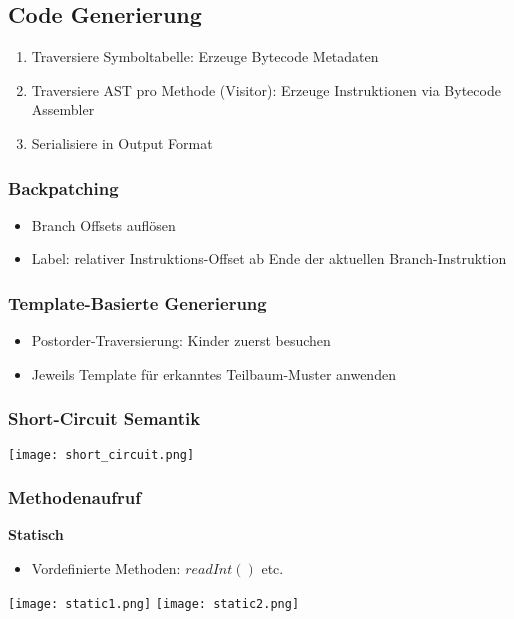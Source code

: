 \subsection{Code Generierung}
\begin{enumerate}
    \item Traversiere Symboltabelle: Erzeuge Bytecode Metadaten
    \item Traversiere AST pro Methode (Visitor): Erzeuge Instruktionen via Bytecode Assembler
    \item Serialisiere in Output Format
\end{enumerate}

\subsubsection{Backpatching}
\begin{itemize}
    \item Branch Offsets auflösen
    \item Label: relativer Instruktions-Offset ab Ende der aktuellen Branch-Instruktion
\end{itemize}

\subsubsection{Template-Basierte Generierung}
\begin{itemize}
    \item Postorder-Traversierung: Kinder zuerst besuchen
    \item Jeweils Template für erkanntes Teilbaum-Muster anwenden
\end{itemize}

\subsubsection{Short-Circuit Semantik}
\texttt{[image: short\_circuit.png]}

\subsubsection{Methodenaufruf}
\textbf{Statisch}
\begin{itemize}
    \item Vordefinierte Methoden: $readInt()$ etc.
\end{itemize}
\texttt{[image: static1.png]}
\texttt{[image: static2.png]}
\vspace{1cm}\\

